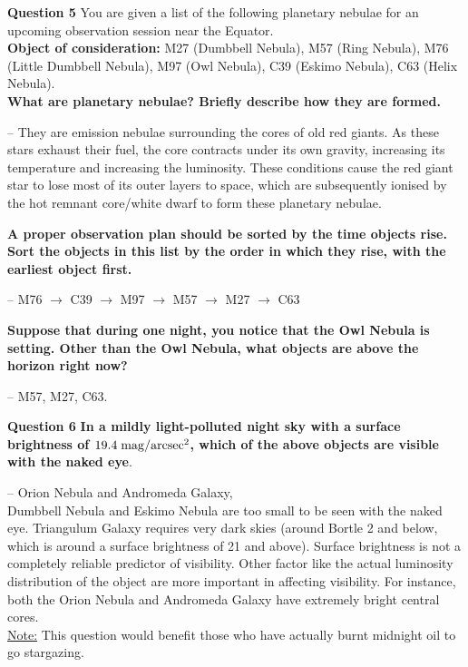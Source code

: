 \documentclass[a4paper,12pt]{extarticle}
\begin{document}
\textsf{\textbf{Question 5}} You are given a list of the following planetary nebulae for an upcoming observation session near the Equator. \\

\textbf{Object of consideration:} M27 (Dumbbell Nebula), M57 (Ring Nebula), M76 (Little Dumbbell Nebula), M97 (Owl Nebula), C39 (Eskimo Nebula), C63 (Helix Nebula).\\

\textbf{What are planetary nebulae? Briefly describe how they are formed.}
\begin{sol}
-- They are emission nebulae surrounding the cores of old red giants. As these stars exhaust their fuel, the core contracts under its own gravity, increasing its temperature and
increasing the luminosity. These conditions cause the red giant star to lose most of its outer layers to space, which are subsequently ionised by the hot remnant core/white dwarf to form these planetary nebulae.	
\end{sol}

\clearpage
\textbf{A proper observation plan should be sorted by the time objects rise. Sort the objects in this list by the order in which they rise, with the earliest object first.}
\begin{sol}
-- M76 $\rightarrow$ C39 $\rightarrow$ M97 $\rightarrow$ M57 $\rightarrow$ M27 $\rightarrow$ C63	
\end{sol}

\textbf{Suppose that during one night, you notice that the Owl Nebula is
setting. Other than the Owl Nebula, what objects are above the
horizon right now?}
\begin{sol}
-- M57, M27, C63.	
\end{sol}

\textsf{\textbf{Question 6}} \textbf{In a mildly light-polluted night sky with a surface brightness of $19.4\; \rm mag/arcsec^2$, which of the above objects are visible with the naked eye}.
\begin{sol}
	-- Orion Nebula and Andromeda Galaxy,\\
	
	Dumbbell Nebula and Eskimo Nebula are too small to be seen with the naked eye. Triangulum Galaxy requires very dark skies (around Bortle 2 and below, which is around a surface brightness of 21 and above). Surface brightness is not a completely reliable predictor of visibility. Other factor like the actual luminosity distribution of the object are more important in affecting visibility. For instance, both the Orion Nebula and Andromeda Galaxy have extremely bright central cores.\\
	
	\underline{Note:} This question would benefit those who have actually burnt midnight oil to go stargazing.
\end{sol}
\end{document}
